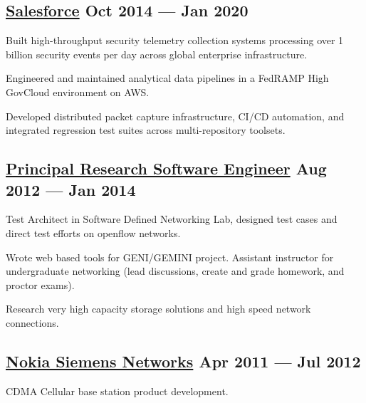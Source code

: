 \subsection{{\href{https://www.salesforce.com/products/what-is-salesforce/}{Salesforce} \hfill Oct 2014 --- Jan 2020}}
\vspace*{5pt}
{\footnotesize
}
\begin{zitemize}
	\item Built high-throughput security telemetry collection systems processing over 1 billion security events per day across global enterprise infrastructure.
	\item Engineered and maintained analytical data pipelines in a FedRAMP High GovCloud environment on AWS.
	\item Developed distributed packet capture infrastructure, CI/CD automation, and integrated regression test suites across multi-repository toolsets.
\end{zitemize}

\vspace*{5pt}
\subsection{{\href{https://www.paloaltonetworks.com/about-us}{Principal Research Software Engineer} \hfill Aug 2012 --- Jan 2014}}
\vspace*{5pt}
{\footnotesize
}
\begin{zitemize}
	\item Test Architect in Software Defined Networking Lab, designed test cases and direct test efforts on openflow networks.
	\item Wrote web based tools for GENI/GEMINI project. Assistant instructor for undergraduate networking (lead discussions, create and grade homework, and proctor exams).
	\item Research very high capacity storage solutions and high speed network connections.
\end{zitemize}

\vspace*{5pt}
\subsection{{\href{https://www.nokia.com/we-are-nokia/}{Nokia Siemens Networks} \hfill Apr 2011 --- Jul 2012}}
\vspace*{5pt}
{\footnotesize
}
\begin{zitemize}
	\item CDMA Cellular base station product development.
\end{zitemize}

